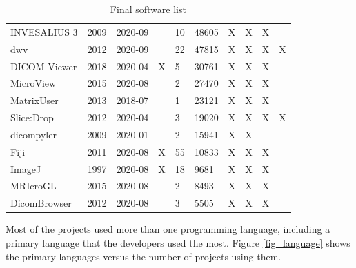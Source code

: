 \documentclass[preprint,12pt,authoryear]{elsarticle}
\begin{document}
\begin{table}[ht]
\begin{tabular}{llllllllll}
INVESALIUS 3 \citep{Amorim2015} & 2009 & 2020-09 &  & 10 & 48605 & X & X & X &  \\
dwv \citep{Martelli2021} & 2012 & 2020-09 &  & 22 & 47815 & X & X & X & X \\
DICOM Viewer \citep{Afsar2021} & 2018 & 2020-04 & X & 5 & 30761 & X & X & X &  \\
MicroView \citep{ParallaxInnovations2020} & 2015 & 2020-08 &  & 2 & 27470 & X & X & X &  \\
MatrixUser \citep{Liu2016} & 2013 & 2018-07 &  & 1 & 23121 & X & X & X &  \\
Slice:Drop \citep{Haehn2013} & 2012 & 2020-04 &  & 3 & 19020 & X & X & X & X \\
dicompyler \citep{Panchal2010} & 2009 & 2020-01 &  & 2 & 15941 & X & X &  &  \\
Fiji \citep{Schindelin2012} & 2011 & 2020-08 & X & 55 & 10833 & X & X & X &  \\
ImageJ \citep{Rueden2017} & 1997 & 2020-08 & X & 18 & 9681 & X & X & X &  \\
MRIcroGL \citep{Rorden2021} & 2015 & 2020-08 &  & 2 & 8493 & X & X & X &  \\
DicomBrowser \citep{Archie2012} & 2012 & 2020-08 &  & 3 & 5505 & X & X & X &  \\ \hline
\end{tabular}
\caption{\label{tab_final_list}Final software list}
\end{table}

Most of the projects used more than one programming language, including a
primary language that the developers used the most. Figure \ref{fig_language}
shows the primary languages versus the number of projects using them.


\end{document}
